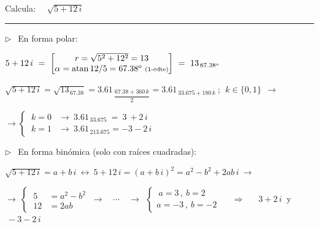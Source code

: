 \begin{miejercicio}

Calcula: $\quad \sqrt{5+12\, i}$

\rule{250pt}{0.5pt}

\vspace{2mm} $\triangleright \ \ $ En forma polar:	

\vspace{2mm} $5+12\, i\  = \ \left[ \mqty{ r=\sqrt{5^2+12^2}=13 \\ \alpha=\atan 12/5=67.38^o \ \scriptsize{\text{(1-cdte)}}} \right] \ = \ 13_{\, 67.38^o}$

\vspace{2mm} $\sqrt{5+12\, i} = \sqrt{13_{\, 67.38}}= 3.61_{\  \dfrac{67.38+360\, k}{2}  }=3.61_{\ 33.675+180\, k}\ ; \ \ k\in\{0,1\} \ \ \to $

\vspace{2mm} $\to \begin{cases} \ k=0 &\to \ 3.61_{\, 33.675}\ =\ 3\ +2\, i \\ \ k=1 &\to \ 3.61_{\, 213.675}=-3-2\, i\end{cases}$


\vspace{4mm} $\triangleright \ \ $ En forma binómica  \textcolor{gris}{(solo con raíces cuadradas)}:	

\vspace{2mm}  $\sqrt{5+12\, i}=a+b\, i \ \leftrightarrow \ 5+12\, i=(a+b\, i)^2=a^2-b^2+2ab\, i \ \to $

\vspace{2mm} $\to \ \begin{cases} \ 5&=a^2-b^2 \\ \ 12&=2ab \end{cases} \ \to \quad \cdots \quad \to \ \ \begin{cases} \ a=3\, , \ b=2 \\ a=-3\, , \ b=-2 \end{cases}$ $\quad \Rightarrow \quad $  $\ 3+2\, i \ $ y $ \ -3-2\, i$

\end{miejercicio}


